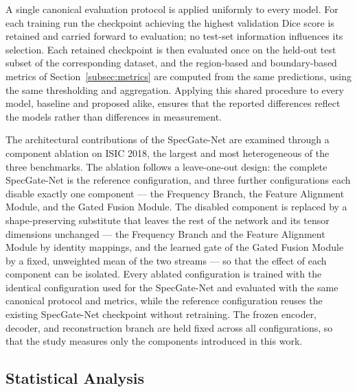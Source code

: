 A single canonical evaluation protocol is applied uniformly to every model. For each training run the checkpoint achieving the highest validation Dice score is retained and carried forward to evaluation; no test-set information influences its selection. Each retained checkpoint is then evaluated once on the held-out test subset of the corresponding dataset, and the region-based and boundary-based metrics of Section~\ref{subsec:metrics} are computed from the same predictions, using the same thresholding and aggregation. Applying this shared procedure to every model, baseline and proposed alike, ensures that the reported differences reflect the models rather than differences in measurement.

The architectural contributions of the SpecGate-Net are examined through a component ablation on ISIC 2018, the largest and most heterogeneous of the three benchmarks. The ablation follows a leave-one-out design: the complete SpecGate-Net is the reference configuration, and three further configurations each disable exactly one component --- the Frequency Branch, the Feature Alignment Module, and the Gated Fusion Module. The disabled component is replaced by a shape-preserving substitute that leaves the rest of the network and its tensor dimensions unchanged --- the Frequency Branch and the Feature Alignment Module by identity mappings, and the learned gate of the Gated Fusion Module by a fixed, unweighted mean of the two streams --- so that the effect of each component can be isolated. Every ablated configuration is trained with the identical configuration used for the SpecGate-Net and evaluated with the same canonical protocol and metrics, while the reference configuration reuses the existing SpecGate-Net checkpoint without retraining. The frozen encoder, decoder, and reconstruction branch are held fixed across all configurations, so that the study measures only the components introduced in this work.

\subsection{Statistical Analysis}
\label{subsec:stats}

